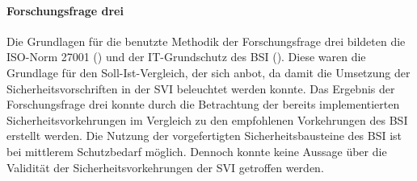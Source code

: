 \paragraph{Forschungsfrage drei}
Die Grundlagen für die benutzte Methodik der Forschungsfrage drei bildeten die ISO-Norm 27001 (\cite{dindeutsches_institut_fur_normung_informationstechnik_2020}) und der IT-Grundschutz des \ac{BSI} (\cite{bundesamt_fur_sicherheit_in_der_informationstechnik_bsi_it-grundschutz-kompendium_2020}). Diese waren die Grundlage für den Soll-Ist-Vergleich, der sich anbot, da damit die Umsetzung der Sicherheitsvorschriften in der \ac{SVI} beleuchtet werden konnte. Das Ergebnis der Forschungsfrage drei konnte durch die Betrachtung der bereits implementierten Sicherheitsvorkehrungen im Vergleich zu den empfohlenen Vorkehrungen des \ac{BSI} erstellt werden. Die Nutzung der vorgefertigten Sicherheitsbausteine des \ac{BSI} ist bei mittlerem Schutzbedarf möglich. Dennoch konnte keine Aussage über die Validität der Sicherheitsvorkehrungen der \ac{SVI} getroffen werden.  